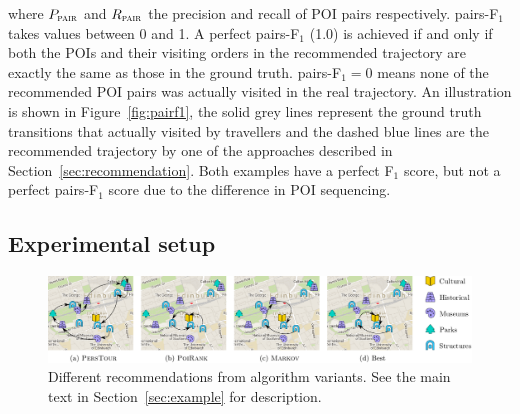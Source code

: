 where $P_{\textsc{pair}}$ and $R_{\textsc{pair}}$ the precision and recall of POI pairs respectively.
%
%
%
%
pairs-F$_1$ takes values between 0 and 1. A perfect pairs-F$_1$ (1.0) is achieved if and only if
both the POIs and their visiting orders in the
recommended trajectory are exactly the same as those in the ground truth.
pairs-F$_1 = 0$ means none of the recommended POI pairs was actually visited in the real trajectory.
An illustration is shown in Figure~\ref{fig:pairf1},
the solid grey lines represent the ground truth transitions that actually visited by travellers
and the dashed blue lines are the recommended trajectory by one of the approaches described in Section~\ref{sec:recommendation}.
Both examples have a perfect F$_1$ score, but not a perfect pairs-F$_1$ score due to the difference in POI sequencing.


\subsection{Experimental setup}
\label{sec:setup}
\secmoveup
%

%

%
\begin{figure}[t]
	\centering
	\includegraphics[width=\textwidth]{fig/example-tour.pdf}
	\caption{Different recommendations from algorithm variants.
    See the main text in Section~\ref{sec:example} for description.}
	\label{fig:exampleresult}
	\captionmoveup
\end{figure}

